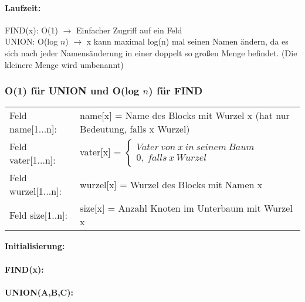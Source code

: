 \documentclass[10pt,a4paper]{article}
\begin{document}
\paragraph*{Laufzeit:}
FIND(x): O(1) $\rightarrow$ Einfacher Zugriff auf ein Feld\\ 
UNION: O(log $n$) $\rightarrow$ x kann maximal log(n) mal seinen Namen ändern, da es sich nach jeder Namensänderung in einer doppelt so großen Menge befindet. (Die kleinere Menge wird umbenannt)


\subsubsection*{O(1) für UNION und O(log $n$) für FIND}
\begin{tabular}{ll}
	Feld name[1...n]:& name[x] = Name des Blocks mit Wurzel x (hat nur Bedeutung, falls x Wurzel) \\
	Feld vater[1...n]:& vater[x] = $\begin{cases}
	Vater\ von\ x\ in\ seinem\ Baum\\
	0,\ falls\ x\ Wurzel
	\end{cases}$ \\
	Feld wurzel[1...n]:& wurzel[x] = Wurzel des Blocks mit Namen x \\
	Feld size[1..n]:& size[x] = Anzahl Knoten im Unterbaum mit Wurzel x \\
\end{tabular}
\begin{algorithm}[H]
	\textbf{Initialisierung:}	\\
	~\\
	\textbf{FIND(x):} \\
	~\\
	
	\textbf{UNION(A,B,C):} \\
	
\end{algorithm}
\end{document}
